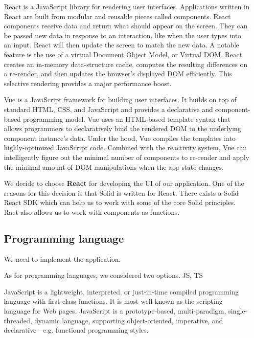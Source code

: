   React is a JavaScript library for rendering user interfaces.
  Applications written in React are built from modular and reusable pieces called components.
  React components receive data and return what should appear on the screen. 
  They can be passed new data in response to an interaction, like when the user types into an input. 
  React will then update the screen to match the new data.
  A notable feature is the use of a virtual Document Object Model, or Virtual DOM. 
  React creates an in-memory data-structure cache, computes the resulting differences on a re-render, and then updates the browser's displayed DOM efficiently. 
  This selective rendering provides a major performance boost.

  Vue is a JavaScript framework for building user interfaces. 
  It builds on top of standard HTML, CSS, and JavaScript and provides a declarative and component-based programming model.
  Vue uses an HTML-based template syntax that allows programmers to declaratively bind the rendered DOM to the underlying component instance's data.
  Under the hood, Vue compiles the templates into highly-optimized JavaScript code. 
  Combined with the reactivity system, Vue can intelligently figure out the minimal number of components to re-render and apply the minimal amount of DOM manipulations when the app state changes.

  We decide to choose \textbf{React} for developing the UI of our application.
  One of the reasons for this decision is that Solid is written for React.
  There exists a Solid React SDK which can help us to work with some of the core Solid principles.
  Ract also allows us to work with components as functions.

\subsection*{Programming language}
  We need to implement the application.

  As for programming languages, we considered two options. 
  JS, TS

  JavaScript is a lightweight, interpreted, or just-in-time compiled programming language with first-class functions. 
  It is most well-known as the scripting language for Web pages. 
  JavaScript is a prototype-based, multi-paradigm, single-threaded, dynamic language, supporting object-oriented, imperative, and declarative---e.g. functional programming styles.

